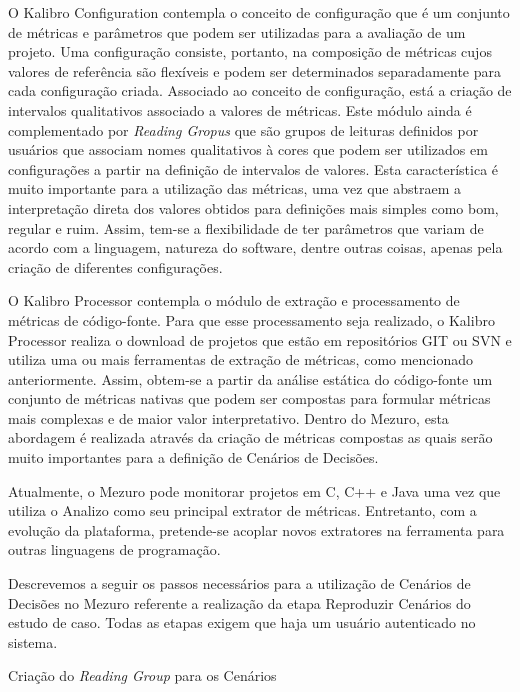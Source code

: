 O Kalibro Configuration contempla o conceito de configuração que é um conjunto de métricas e parâmetros que podem ser utilizadas para a avaliação de um projeto. Uma configuração consiste, portanto, na composição de métricas cujos valores de referência são flexíveis e podem ser determinados separadamente para cada configuração criada. Associado ao conceito de configuração, está a criação de intervalos qualitativos associado a valores de métricas. Este módulo ainda é complementado por \emph{Reading Gropus} que são grupos de leituras definidos por usuários que associam nomes qualitativos à cores que podem ser utilizados em configurações a partir na definição de intervalos de valores. Esta característica é muito importante para a utilização das métricas, uma vez que abstraem a interpretação direta dos valores obtidos para definições mais simples como bom, regular e ruim. Assim, tem-se a flexibilidade de ter parâmetros que variam de acordo com a linguagem, natureza do software, dentre outras coisas, apenas pela criação de diferentes configurações. 

O Kalibro Processor contempla o módulo de extração e processamento de métricas de código-fonte. Para que esse processamento seja realizado, o Kalibro Processor realiza o download de projetos que estão em repositórios GIT ou SVN e utiliza uma ou mais ferramentas de extração de métricas, como mencionado anteriormente. Assim, obtem-se a partir da análise estática do código-fonte um conjunto de métricas nativas que podem ser compostas para formular métricas mais complexas e de maior valor interpretativo. Dentro do Mezuro, esta abordagem é realizada através da criação de métricas compostas as quais serão muito importantes para a definição de Cenários de Decisões. 

Atualmente, o Mezuro pode monitorar projetos em C, C++ e Java uma vez que utiliza o Analizo como seu principal extrator de métricas. Entretanto, com a evolução da plataforma, pretende-se acoplar novos extratores na ferramenta para outras linguagens de programação.

Descrevemos a seguir os passos necessários para a utilização de Cenários de Decisões no Mezuro referente a realização da etapa Reproduzir Cenários do estudo de caso. Todas as etapas exigem que haja um usuário autenticado no sistema.

\begin{description}
	\item[Criação do \emph{Reading Group} para os Cenários]
\end{description}

